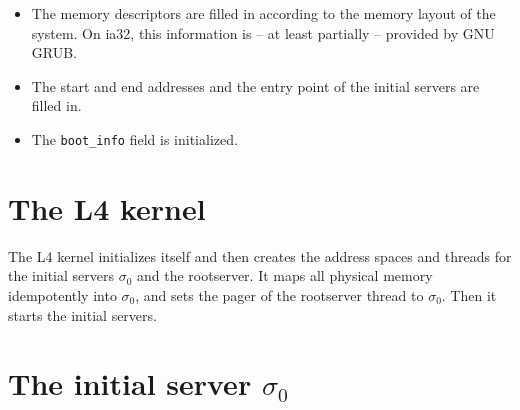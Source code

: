 \begin{itemize}
\item The memory descriptors are filled in according to the memory
  layout of the system.  On ia32, this information is -- at least
  partially -- provided by GNU GRUB.

  \begin{comment}
    GNU GRUB seems to omit information about the memory that is shared
    with the VGA card.  \texttt{laden} creates a special entry for
    that region, overriding any previous memory descriptor.
  \end{comment}
  
\item The start and end addresses and the entry point of the initial
  servers are filled in.

  \begin{comment}
    A future version of L4 should support adding information about the
    UTCB area of the initial rootserver as well.  Until then, the
    rootserver has no clean way to create a new thread (a hack is used
    by the rootserver to calculate the UTCB addresses for other
    threads).
  \end{comment}

\item The \verb/boot_info/ field is initialized.

  \begin{comment}
    The \verb/boot_info/ field is currently set to the GNU GRUB
    \verb/multiboot_info/ structure.  This only works for the ia32
    architecture of course.  We might want to have a more architecture
    independent way to pass the information about further modules to
    the rootserver.  We also might want to gather the information
    provided by GNU GRUB in a single page (if it is not).
  \end{comment}
\end{itemize}


\section{The L4 kernel}

The L4 kernel initializes itself and then creates the address spaces
and threads for the initial servers $\sigma_0$ and the rootserver.  It
maps all physical memory idempotently into $\sigma_0$, and sets the
pager of the rootserver thread to $\sigma_0$.  Then it starts the
initial servers.


\section{The initial server $\sigma_0$}

